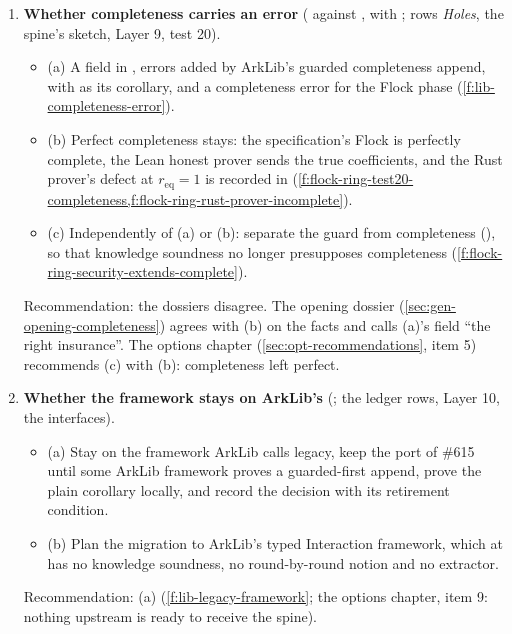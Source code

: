 \begin{enumerate}[leftmargin=*, itemsep=6pt]
\item \textbf{Whether completeness carries an error} ( against , with
  ; rows \emph{Holes}, the spine's sketch, Layer 9, test 20).
  \begin{itemize}[label={}, leftmargin=1.2em]
  \item (a) A field  in , errors added by ArkLib's guarded
    completeness append,  with  as its
    corollary, and a completeness error for the Flock phase (\cref{f:lib-completeness-error}).
  \item (b) Perfect completeness stays: the specification's Flock is perfectly complete, the Lean
    honest prover sends the true coefficients, and the Rust prover's defect at $r_{\mathrm{eq}} = 1$
    is recorded in  (\cref{f:flock-ring-test20-completeness,f:flock-ring-rust-prover-incomplete}).
  \item (c) Independently of (a) or (b): separate the guard from completeness
    (), so that knowledge soundness no longer presupposes completeness
    (\cref{f:flock-ring-security-extends-complete}).
  \end{itemize}
  Recommendation: the dossiers disagree. The opening dossier (\cref{sec:gen-opening-completeness}) agrees with (b) on the
  facts and calls (a)'s field \enquote{the right insurance}. The options chapter
  (\cref{sec:opt-recommendations}, item 5) recommends (c) with (b): completeness left perfect.

\item \textbf{Whether the framework stays on ArkLib's } (; the
  ledger rows, Layer 10, the interfaces).
  \begin{itemize}[label={}, leftmargin=1.2em]
  \item (a) Stay on the framework ArkLib calls legacy, keep the port of \#615 until some ArkLib
    framework proves a guarded-first append, prove the plain corollary locally, and record the
    decision with its retirement condition.
  \item (b) Plan the migration to ArkLib's typed Interaction framework, which at  has
    no knowledge soundness, no round-by-round notion and no extractor.
  \end{itemize}
  Recommendation: (a) (\cref{f:lib-legacy-framework}; the options chapter, item 9: nothing upstream
  is ready to receive the spine).


\end{enumerate}

